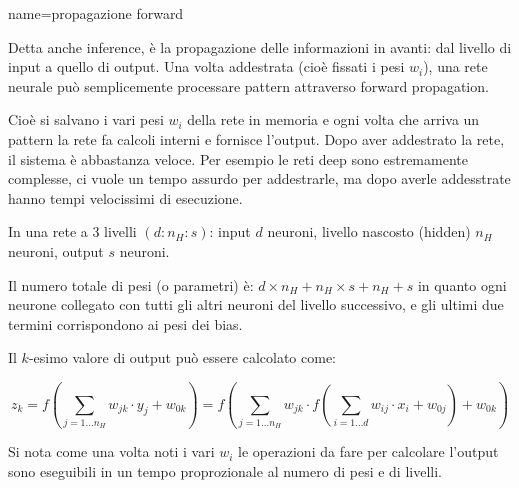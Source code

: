 {
name={propagazione forward}
}{
Detta anche inference, è la propagazione
delle informazioni in avanti: dal livello di input a quello di output.
Una volta addestrata (cioè fissati i pesi \(w_i\)), una rete neurale può semplicemente
processare pattern attraverso forward propagation.

Cioè si salvano i vari pesi \(w_i\) della rete in memoria e ogni volta che arriva un pattern la rete fa calcoli interni e fornisce l'output. Dopo aver addestrato la rete, il sistema è abbastanza veloce. Per esempio le reti deep  sono estremamente complesse, ci vuole un tempo assurdo per addestrarle, ma dopo averle addesstrate hanno tempi velocissimi di esecuzione.

In una rete a 3 livelli \( \left(d: n_{H}: s\right) \):
input \( d \) neuroni, livello nascosto (hidden) \( n_{H} \) neuroni, output \( s \) neuroni.

Il numero totale di pesi (o parametri) è: \( d \times n_{H}+n_{H} \times s+n_{H}+s \) in quanto ogni neurone collegato con tutti gli altri neuroni del livello successivo, e gli ultimi due termini corrispondono ai pesi dei bias.

Il \( k \)-esimo valore di output può essere calcolato come:

\[ z_{k}=f\left(\sum_{j=1 \ldots n_{H}} w_{j k} \cdot y_{j}+w_{0 k}\right)=f\left(\sum_{j=1 \ldots n_{H}} w_{j k} \cdot f\left(\sum_{i=1 \ldots d} w_{i j} \cdot x_{i}+w_{0 j}\right)+w_{0 k}\right) \]

Si nota come una volta noti i vari \(w_i\) le operazioni da fare per calcolare l'output sono eseguibili in un tempo proprozionale al numero di pesi e di livelli.
}


